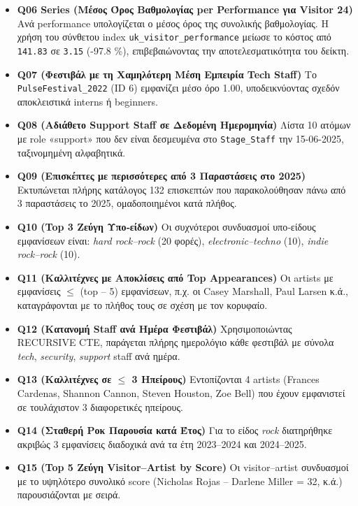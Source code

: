 \documentclass[a4paper,12pt]{article}
\begin{document}
\begin{itemize}
  \item \textbf{Q06 Series (Μέσος Όρος Βαθμολογίας per Performance για Visitor 24)}  
    Ανά performance υπολογίζεται ο μέσος όρος της συνολικής βαθμολογίας.  
    Η χρήση του σύνθετου index \texttt{uk\_visitor\_performance} μείωσε το
    κόστος από \verb|141.83| σε \verb|3.15| (-97.8 \%), επιβεβαιώνοντας
    την αποτελεσματικότητα του δείκτη.

  \item \textbf{Q07 (Φεστιβάλ με τη Χαμηλότερη Μέση Εμπειρία Tech Staff)}  
    Το \texttt{PulseFestival\_2022} (ID 6) εμφανίζει μέσο όρο 1.00, 
    υποδεικνύοντας σχεδόν αποκλειστικά interns ή beginners.

  \item \textbf{Q08 (Αδιάθετο Support Staff σε Δεδομένη Ημερομηνία)}  
    Λίστα 10 ατόμων με role «support» που δεν είναι δεσμευμένα
    στο \texttt{Stage\_Staff} την 15-06-2025, ταξινομημένη αλφαβητικά.

  \item \textbf{Q09 (Επισκέπτες με περισσότερες από 3 Παραστάσεις στο 2025)}  
    Εκτυπώνεται πλήρης κατάλογος 132 επισκεπτών που παρακολούθησαν
    πάνω από 3 παραστάσεις το 2025, ομαδοποιημένοι κατά πλήθος.

  \item \textbf{Q10 (Top 3 Ζεύγη Υπο‐είδων)}  
    Οι συχνότεροι συνδυασμοί υπο‐είδους εμφανίσεων είναι:
    \emph{hard rock–rock} (20 φορές), \emph{electronic–techno} (10),
    \emph{indie rock–rock} (10).

  \item \textbf{Q11 (Καλλιτέχνες με Αποκλίσεις από Top Appearances)}  
    Οι artists με εμφανίσεις \(\leq\) (top – 5) εμφανίσεων, π.χ. οι Casey Marshall,
      Paul Larsen κ.ά., καταγράφονται με το πλήθος τους σε σχέση με τον κορυφαίο.

  \item \textbf{Q12 (Κατανομή Staff ανά Ημέρα Φεστιβάλ)}  
    Χρησιμοποιώντας RECURSIVE CTE, παράγεται πλήρης ημερολόγιο κάθε φεστιβάλ
    με σύνολα \emph{tech}, \emph{security}, \emph{support} staff ανά ημέρα.

  \item \textbf{Q13 (Καλλιτέχνες σε \(\leq\) 3 Ηπείρους)}  
    Εντοπίζονται 4 artists (Frances Cardenas, Shannon Cannon, Steven Houston, Zoe Bell)
    που έχουν εμφανιστεί σε τουλάχιστον 3 διαφορετικές ηπείρους.

  \item \textbf{Q14 (Σταθερή Ροκ Παρουσία κατά Έτος)}  
    Για το είδος \emph{rock} διατηρήθηκε ακριβώς 3 εμφανίσεις
    διαδοχικά ανά τα έτη 2023–2024 και 2024–2025.

  \item \textbf{Q15 (Top 5 Ζεύγη Visitor–Artist by Score)}  
    Οι visitor–artist συνδυασμοί με το υψηλότερο συνολικό score
    (Nicholas Rojas – Darlene Miller = 32, κ.ά.) παρουσιάζονται με σειρά.

\end{itemize}
\end{document}
